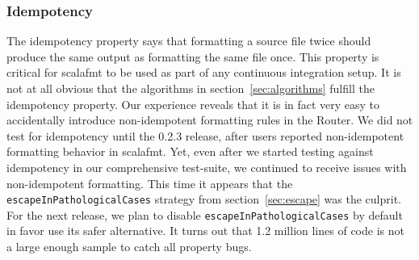 \subsubsection{Idempotency}
The idempotency property says that formatting a source file twice should produce the same output as formatting the same file once.
This property is critical for scalafmt to be used as part of any continuous integration setup.
It is not at all obvious that the algorithms in section~\ref{sec:algorithms} fulfill the idempotency property.
Our experience reveals that it is in fact very easy to accidentally introduce non-idempotent formatting rules in the Router.
We did not test for idempotency until the 0.2.3 release, after users reported non-idempotent formatting behavior in scalafmt.
Yet, even after we started testing against idempotency in our comprehensive test-suite, we continued to receive issues with non-idempotent formatting.
This time it appears that the \texttt{escapeInPathologicalCases} strategy from section~\ref{sec:escape} was the culprit.
For the next release, we plan to disable \texttt{escapeInPathologicalCases} by default in favor use its safer alternative.
It turns out that 1.2 million lines of code is not a large enough sample to catch all property bugs.
